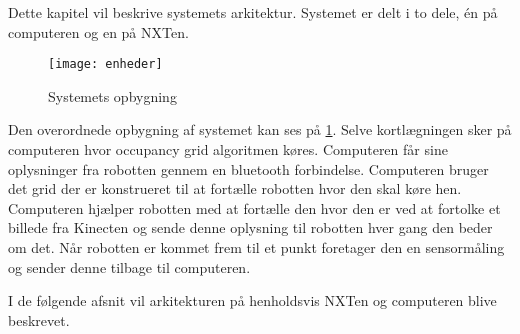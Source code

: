 Dette kapitel vil beskrive systemets arkitektur.
Systemet er delt i to dele, én på computeren og en på NXTen.


\begin{figure}[H]
\centering
\texttt{[image: enheder]}
\caption{Systemets opbygning}
\label{arkitektur:opbygning}
\end{figure}

Den overordnede opbygning af systemet kan ses på \cref{arkitektur:opbygning}.
Selve kortlægningen sker på computeren hvor occupancy grid algoritmen køres.
Computeren får sine oplysninger fra robotten gennem en bluetooth forbindelse.
Computeren bruger det grid der er konstrueret til at fortælle robotten hvor den skal køre hen.
Computeren hjælper robotten med at fortælle den hvor den er ved at fortolke et billede fra Kinecten og sende denne oplysning til robotten hver gang den beder om det.
Når robotten er kommet frem til et punkt foretager den en sensormåling og sender denne tilbage til computeren.

I de følgende afsnit vil arkitekturen på henholdsvis NXTen og computeren blive beskrevet.

